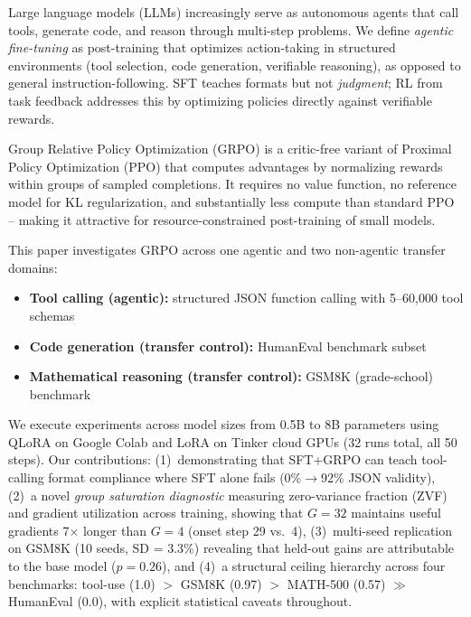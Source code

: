 \documentclass{article}
\begin{document}
Large language models (LLMs) increasingly serve as autonomous agents that call tools, generate code, and reason through multi-step problems. We define \emph{agentic fine-tuning} as post-training that optimizes action-taking in structured environments (tool selection, code generation, verifiable reasoning), as opposed to general instruction-following. SFT teaches formats but not \emph{judgment}; RL from task feedback addresses this by optimizing policies directly against verifiable rewards.

Group Relative Policy Optimization (GRPO) \citep{shao2024deepseekmath} is a critic-free variant of Proximal Policy Optimization (PPO) that computes advantages by normalizing rewards within groups of sampled completions. It requires no value function, no reference model for KL regularization, and substantially less compute than standard PPO -- making it attractive for resource-constrained post-training of small models.

This paper investigates GRPO across one agentic and two non-agentic transfer domains:
\begin{itemize}
    \item \textbf{Tool calling (agentic):} structured JSON function calling with 5--60,000 tool schemas
    \item \textbf{Code generation (transfer control):} HumanEval benchmark subset
    \item \textbf{Mathematical reasoning (transfer control):} GSM8K (grade-school) benchmark
\end{itemize}

We execute experiments across model sizes from 0.5B to 8B parameters using QLoRA on Google Colab and LoRA on Tinker cloud GPUs (32 runs total, all 50 steps). Our contributions: (1)~demonstrating that SFT+GRPO can teach tool-calling format compliance where SFT alone fails (0\%$\rightarrow$92\% JSON validity), (2)~a novel \emph{group saturation diagnostic} measuring zero-variance fraction (ZVF) and gradient utilization across training, showing that $G{=}32$ maintains useful gradients 7$\times$ longer than $G{=}4$ (onset step 29 vs.\ 4), (3)~multi-seed replication on GSM8K (10 seeds, SD = 3.3\%) revealing that held-out gains are attributable to the base model ($p{=}0.26$), and (4)~a structural ceiling hierarchy across four benchmarks: tool-use (1.0) $>$ GSM8K (0.97) $>$ MATH-500 (0.57) $\gg$ HumanEval (0.0), with explicit statistical caveats throughout.

\end{document}
